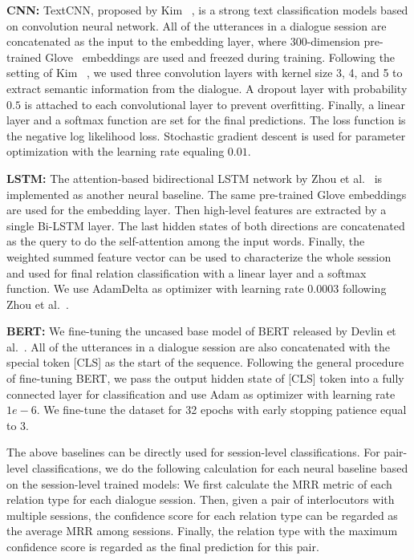 \documentclass[letterpaper]{article} \usepackage{aaai21}  \usepackage{times}  \usepackage{helvet} \usepackage{courier}  \usepackage[hyphens]{url}  \usepackage{graphicx} \usepackage{xcolor}
\begin{document}
\textbf{CNN:}
TextCNN, proposed by Kim ~, is a strong text classification models 
based on convolution neural network.
All of the utterances in a dialogue session are concatenated as the input to the 
embedding layer, where 300-dimension pre-trained Glove~ 
embeddings are used and freezed 
during training. Following the setting of Kim ~, we used three convolution layers
with kernel size 3, 4, and 5 to extract semantic information from the dialogue. A dropout layer with 
probability $0.5$ is attached to each convolutional layer to prevent overfitting.
Finally, a linear layer and a softmax function are set for the final predictions. 
The loss function is the negative log likelihood loss. Stochastic gradient descent is 
used for parameter optimization with the learning rate equaling $0.01$. 

\textbf{LSTM:}
The attention-based bidirectional LSTM network by Zhou et al.~ 
is implemented as another neural baseline. The same pre-trained Glove embeddings are 
used for the embedding layer. Then high-level features are extracted by a single 
Bi-LSTM layer. The last hidden states of both directions are concatenated as the 
query to do the self-attention among the input words. Finally, the weighted summed 
feature vector can be used to characterize the whole session and used for final relation 
classification with a linear layer and a softmax function. We use AdamDelta as optimizer with
learning rate $0.0003$ following Zhou et al.~.

\textbf{BERT:}
We fine-tuning the uncased base model of BERT released by 
Devlin et al.~. 
All of the utterances in a dialogue session 
are also concatenated with the special token [CLS] as the start of the sequence.
Following the general procedure of fine-tuning BERT, we pass the output hidden state of 
[CLS] token into a fully connected layer for classification and use Adam as optimizer
with learning rate $1e-6$. We fine-tune the dataset for 32 epochs with early stopping
patience equal to 3.

The above baselines can be directly used for session-level classifications. For pair-level classifications, we do the following calculation for each neural baseline based on the session-level trained models: We first calculate the MRR metric of each relation type for each dialogue session. Then, given a pair of interlocutors with multiple sessions, the confidence score for each relation type can be regarded as the average MRR among sessions. Finally, the relation type with the maximum confidence score is regarded as the final prediction for this pair. 
\end{document}
